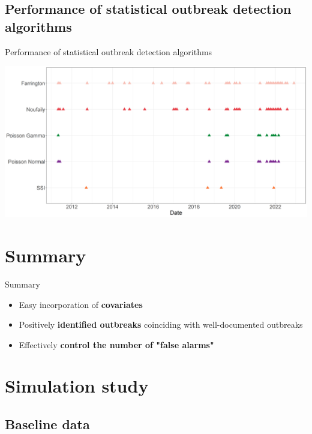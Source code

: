 \documentclass[aspectratio=169]{beamer}
\begin{document}
\hypertarget{performance-of-statistical-outbreak-detection-algorithms}{%
\subsection{Performance of statistical outbreak detection
algorithms}\label{performance-of-statistical-outbreak-detection-algorithms}}

\begin{frame}{Performance of statistical outbreak detection algorithms}
\tiny

\includegraphics[width=1\linewidth]{../figures/Compare_alarms_95}

\normalsize
\end{frame}

\hypertarget{summary}{%
\section{Summary}\label{summary}}

\begin{frame}{Summary}
\begin{itemize}
  \item Easy incorporation of \textbf{covariates}
  \item Positively \textbf{identified outbreaks} coinciding with well-documented outbreaks
  \item Effectively \textbf{control the number of "false alarms"}
\end{itemize}
\end{frame}

\hypertarget{simulation-study}{%
\section{Simulation study}\label{simulation-study}}

\hypertarget{baseline-data}{%
\subsection{Baseline data}\label{baseline-data}}
\end{document}
